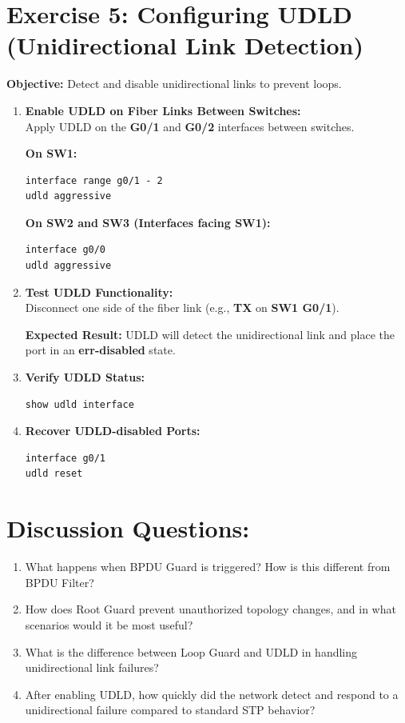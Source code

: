 \documentclass[a4paper]{book}
\begin{document}
\section*{Exercise 5: Configuring UDLD (Unidirectional Link Detection)}

\textbf{Objective:} Detect and disable unidirectional links to prevent loops.

\begin{enumerate} 
    \item \textbf{Enable UDLD on Fiber Links Between Switches:} \\
    Apply UDLD on the \textbf{G0/1} and \textbf{G0/2} interfaces between switches.

    \textbf{On SW1:}
    \begin{verbatim}
interface range g0/1 - 2
udld aggressive
    \end{verbatim}

    \textbf{On SW2 and SW3 (Interfaces facing SW1):}
    \begin{verbatim}
interface g0/0
udld aggressive
    \end{verbatim}

    \item \textbf{Test UDLD Functionality:} \\
    Disconnect one side of the fiber link (e.g., \textbf{TX} on \textbf{SW1 G0/1}).

    \textbf{Expected Result:} UDLD will detect the unidirectional link and place the port in an \textbf{err-disabled} state.

    \item \textbf{Verify UDLD Status:}
    \begin{verbatim}
show udld interface
    \end{verbatim}

    \item \textbf{Recover UDLD-disabled Ports:}
    \begin{verbatim}
interface g0/1
udld reset
    \end{verbatim}
\end{enumerate}

\section*{Discussion Questions:}

\begin{enumerate} 
    \item What happens when BPDU Guard is triggered? How is this different from BPDU Filter?
    \item How does Root Guard prevent unauthorized topology changes, and in what scenarios would it be most useful?
    \item What is the difference between Loop Guard and UDLD in handling unidirectional link failures?
    \item After enabling UDLD, how quickly did the network detect and respond to a unidirectional failure compared to standard STP behavior?
\end{enumerate}
\end{document}
